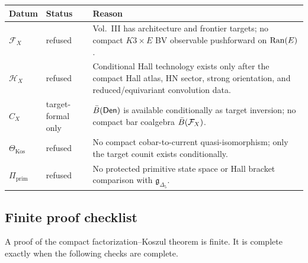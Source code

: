 \begin{center}
\begingroup
\small
\begin{tabular}{p{}|p{}|p{}}
\textbf{Datum} & \textbf{Status} & \textbf{Reason}\\ \hline
\(\mathcal F_X\) & refused & Vol.~III has architecture and frontier
targets; no compact \(K3\times E\) BV observable pushforward on
\(\operatorname{Ran}(E)\).\\
\(\mathcal H_X\) & refused & Conditional Hall technology exists only
after the compact Hall atlas, HN sector, strong orientation, and
reduced/equivariant convolution data.\\
\(C_X\) & target-formal only & \(\bar B(\mathsf{Den})\) is available
conditionally as target inversion; no compact bar coalgebra
\(\bar B(\mathcal F_X)\).\\
\(\Theta_{\mathrm{Kos}}\) & refused & No compact cobar-to-current
quasi-isomorphism; only the target counit exists conditionally.\\
\(\Pi_{\mathrm{prim}}\) & refused & No protected primitive state space
or Hall bracket comparison with \(\mathfrak g_{\Delta_5}\).
\end{tabular}
\endgroup
\end{center}

\subsection{Finite proof checklist}
\label{subsec:cell-eleven-checklist}

A proof of the compact factorization--Koszul theorem is finite.  It is
complete exactly when the following checks are complete.

